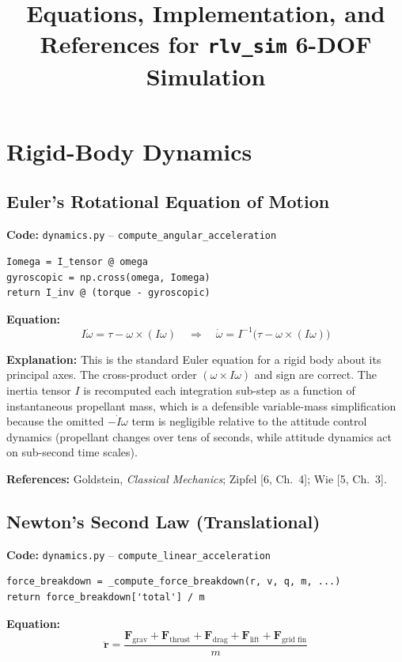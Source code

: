 \documentclass[12pt,a4paper]{article}
\title{Equations, Implementation, and References for \texttt{rlv\_sim} 6-DOF Simulation}
\author{}
\date{}
\begin{document}
\maketitle


\section{Rigid-Body Dynamics}

\subsection{Euler's Rotational Equation of Motion}

\textbf{Code:} \texttt{dynamics.py} – \texttt{compute\_angular\_acceleration}
\begin{verbatim}
Iomega = I_tensor @ omega
gyroscopic = np.cross(omega, Iomega)
return I_inv @ (torque - gyroscopic)
\end{verbatim}

\textbf{Equation:}
\[
I\dot{\omega} = \tau - \omega \times (I\omega) \quad\Longrightarrow\quad \dot{\omega} = I^{-1}\bigl(\tau - \omega \times (I\omega)\bigr)
\]

\textbf{Explanation:} This is the standard Euler equation for a rigid body about its principal axes. The cross-product order $(\omega \times I\omega)$ and sign are correct. The inertia tensor $I$ is recomputed each integration sub-step as a function of instantaneous propellant mass, which is a defensible variable-mass simplification because the omitted $-\dot{I}\omega$ term is negligible relative to the attitude control dynamics (propellant changes over tens of seconds, while attitude dynamics act on sub-second time scales).

\textbf{References:} Goldstein, \textit{Classical Mechanics}; Zipfel [6, Ch.~4]; Wie [5, Ch.~3].

\subsection{Newton's Second Law (Translational)}

\textbf{Code:} \texttt{dynamics.py} – \texttt{compute\_linear\_acceleration}
\begin{verbatim}
force_breakdown = _compute_force_breakdown(r, v, q, m, ...)
return force_breakdown['total'] / m
\end{verbatim}

\textbf{Equation:}
\[
\ddot{\mathbf{r}} = \frac{\mathbf{F}_{\text{grav}} + \mathbf{F}_{\text{thrust}} + \mathbf{F}_{\text{drag}} + \mathbf{F}_{\text{lift}} + \mathbf{F}_{\text{grid fin}}}{m}
\]
\end{document}
